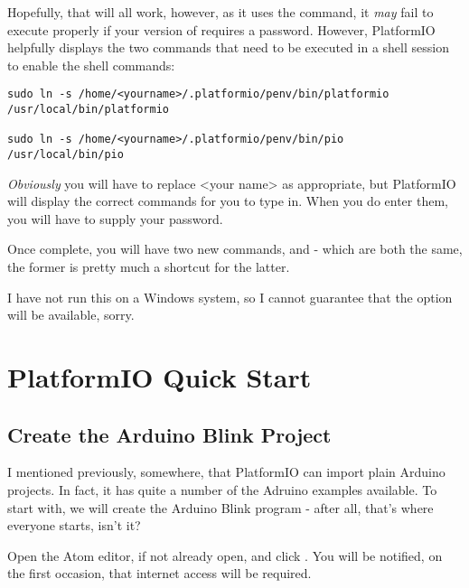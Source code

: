 Hopefully, that will all work, however, as it uses the  command, it \emph{may} fail to execute properly if your version of  requires a password. However, PlatformIO helpfully displays the two commands that need to be executed in a shell session to enable the shell commands:

\begin{lstlisting}[caption={Install PlatformIO Shell Commands Manually}]
sudo ln -s /home/<yourname>/.platformio/penv/bin/platformio /usr/local/bin/platformio

sudo ln -s /home/<yourname>/.platformio/penv/bin/pio /usr/local/bin/pio
\end{lstlisting}

\emph{Obviously} you will have to replace <your name> as appropriate, but PlatformIO will display the correct commands for you to type in. When you do enter them, you will have to supply your  password.

Once complete, you will have two new commands,  and  - which are both the same, the former is pretty much a shortcut for the latter.

\begin{note}
	I have not run this on a Windows system, so I cannot guarantee that the option will be available, sorry.
\end{note}

\section{PlatformIO Quick Start}\label{platformio-quick-start}

\subsection{Create the Arduino Blink Project}\label{create-the-arduino-blink-project}

I mentioned previously, somewhere, that PlatformIO can import plain  Arduino projects. In fact, it has quite a number of the  Adruino examples available. To start with, we will create the Arduino Blink program - after all, that's where everyone starts, isn't it?

Open the Atom editor, if not already open, and click . You will be notified, on the first occasion, that internet access will be required.


